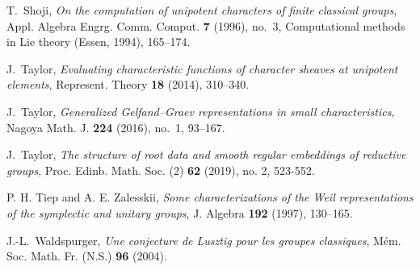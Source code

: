 \documentclass[eqthmnum,nocolour,skinny]{jt-calcs}
\begin{document}
\begin{thebibliography}{99}
{\sc T.~Shoji}, \emph{On the computation of unipotent characters of finite classical groups}, Appl. Algebra Engrg. Comm. Comput. {\bf 7} (1996), no.~3, Computational methods in Lie theory (Essen, 1994), 165--174.

{\sc J.~Taylor}, \emph{Evaluating characteristic functions of character sheaves at unipotent elements}, Represent. Theory {\bf 18} (2014), 310--340.

{\sc J.~Taylor}, \emph{Generalized Gelfand--Graev representations in small characteristics}, Nagoya Math. J. {\bf 224} (2016), no.~1, 93--167.

{\sc J.~Taylor}, \emph{The structure of root data and smooth regular embeddings of reductive groups}, Proc. Edinb. Math. Soc. (2) {\bf 62} (2019), no. 2, 523-552.

{\sc P. H. Tiep and A. E. Zalesskii}, {\it Some characterizations of the Weil
representations of the symplectic and unitary groups}, {J. Algebra} {\bf 192}
(1997), 130--165.


{\sc J.-L.~Waldspurger}, \emph{Une conjecture de {L}usztig pour les groupes classiques}, M{\'e}m. Soc. Math. Fr. (N.S.) {\bf 96} (2004).
\end{thebibliography}
\end{document}
